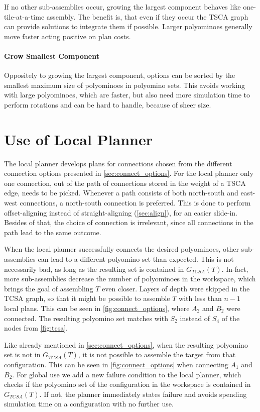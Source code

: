 If no other sub-assemblies occur, growing the largest component behaves like one-tile-at-a-time assembly.
The benefit is, that even if they occur the TSCA graph can provide solutions to integrate them if possible.
Larger polyominoes generally move faster acting positive on plan costs.

\paragraph{Grow Smallest Component}

Oppositely to growing the largest component, options can be sorted by the smallest maximum size of polyominoes in polyomino sets.
This avoids working with large polyominoes, which are faster, but also need more simulation time to perform rotations and can be hard to handle, because of sheer size.


\section{Use of Local Planner}
\label{sec:local_in_global}

The local planner develops plans for connections chosen from the different connection options presented in \autoref{sec:connect_options}.
For the local planner only one connection, out of the path of connections stored in the weight of a TSCA edge, needs to be picked.
Whenever a path consists of both north-south and east-west connections, a north-south connection is preferred.
This is done to perform offset-aligning instead of straight-aligning (\autoref{sec:align}), for an easier slide-in.
Besides of that, the choice of connection is irrelevant, since all connections in the path lead to the same outcome.

When the local planner successfully connects the desired polyominoes, other sub-assemblies can lead to a different polyomino set than expected.
This is not necessarily bad, as long as the resulting set is contained in $G_{TCSA}(T)$.
In-fact, more sub-assemblies decrease the number of polyominoes in the workspace, which brings the goal of assembling $T$ even closer.
Layers of depth were skipped in the TCSA graph, so that it might be possible to assemble $T$ with less than $n-1$ local plans.
This can be seen in \autoref{fig:connect_options}, where $A_2$ and $B_2$ were connected. 
The resulting polyomino set matches with $S_2$ instead of $S_4$ of the nodes from \autoref{fig:tcsa}.

Like already mentioned in \autoref{sec:connect_options}, when the resulting polyomino set is not in $G_{TCSA}(T)$, it is not possible to assemble the target from that configuration.
This can be seen in \autoref{fig:connect_options} when connecting $A_1$ and $B_2$.
For global use we add a new failure condition to the local planner, which checks if the polyomino set of the configuration in the workspace is contained in $G_{TCSA}(T)$.
If not, the planner immediately states failure and avoids spending simulation time on a configuration with no further use.


